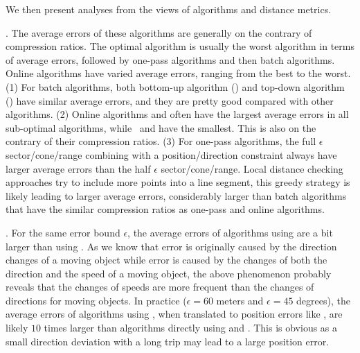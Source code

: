 {We then present analyses from the views of \lsa algorithms and distance metrics.


. The average errors of these algorithms  are generally on the contrary of compression ratios. The optimal algorithm is usually  the worst algorithm in terms of average errors, followed by one-pass algorithms and then batch algorithms.
Online algorithms have varied average errors, ranging from the best to the worst.
(1) For batch algorithms, both bottom-up algorithm (\tpa) and top-down algorithm (\dpa) have similar average errors, and they are pretty good compared with other algorithms.
%
(2) Online algorithms \bqsa and \opwa often have the largest average errors in all sub-optimal algorithms, while {\dagots}~and \squishe have the smallest. This is also on the contrary of their compression ratios.
%
(3) For one-pass algorithms, the full $\epsilon$ sector/cone/range combining with a position/direction constraint always have larger average errors than the half $\epsilon$ sector/cone/range.
%
Local distance checking approaches try to include more points into a line segment, this greedy strategy is likely leading to larger average errors, considerably larger than batch algorithms that have the similar compression ratios as one-pass and online algorithms.


.
For the same error bound $\epsilon$, the average errors of algorithms using \sed are a bit larger than using \ped. {As we know that \ped error is originally caused by the direction changes of a moving object while \sed error is caused by the changes of both the direction and the speed of a moving object, the above phenomenon probably reveals that the changes of speeds are more frequent than the changes of directions for moving objects.}
%
In practice (\eg $\epsilon = 60$ meters and $\epsilon = 45$ degrees), the average errors of algorithms using \dad, when translated to position errors like \ped, are likely $10$ times larger than algorithms directly using \ped and \sed. This is obvious as a small direction deviation with a long trip may lead to a large position error.




}

